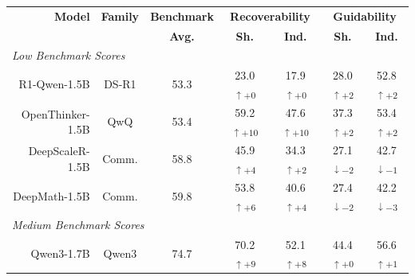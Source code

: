 \documentclass{article} %
\begin{document}
\begin{table}[t]
  \centering
  \small
  \begin{tabular}{r|c|c|cc|cc}
    \toprule
    \textbf{Model} &
    \textbf{Family} &
    \multicolumn{1}{c|}{\textbf{Benchmark}} & 
    \multicolumn{2}{c|}{\textbf{Recoverability}} &
    \multicolumn{2}{c}{\textbf{Guidability}} \\
    &  & \multicolumn{1}{c|}{\textbf{Avg.}} &
    \textbf{Sh.} & \textbf{Ind.} & \textbf{Sh.} & \textbf{Ind.} \\
    \midrule
    \multicolumn{7}{l}{\textit{Low Benchmark Scores}} \\
    \midrule
    
    R1-Qwen-1.5B      & DS-R1 & 53.3 &
    \cellcolor{green!0}23.0\textsubscript{$\uparrow+0$} &
    \cellcolor{green!0}17.9\textsubscript{$\uparrow+0$} &
    \cellcolor{green!12}28.0\textsubscript{$\uparrow+2$} &
    \cellcolor{green!12}52.8\textsubscript{$\uparrow+2$} \\
    
    OpenThinker-1.5B  & QwQ   & 53.4 &
    \cellcolor{green!33}59.2\textsubscript{$\uparrow+10$} &
    \cellcolor{green!33}47.6\textsubscript{$\uparrow+10$} &
    \cellcolor{green!12}37.3\textsubscript{$\uparrow+2$} &
    \cellcolor{green!12}53.4\textsubscript{$\uparrow+2$} \\
    
    DeepScaleR-1.5B   & Comm. & 58.8 &
    \cellcolor{green!15}45.9\textsubscript{$\uparrow+4$} &
    \cellcolor{green!12}34.3\textsubscript{$\uparrow+2$} &
    \cellcolor{red!12}27.1\textsubscript{$\downarrow-2$} &
    \cellcolor{red!11}42.7\textsubscript{$\downarrow-1$} \\
    
    DeepMath-1.5B     & Comm. & 59.8 &
    \cellcolor{green!16}53.8\textsubscript{$\uparrow+6$} &
    \cellcolor{green!15}40.6\textsubscript{$\uparrow+4$} &
    \cellcolor{red!12}27.4\textsubscript{$\downarrow-2$} &
    \cellcolor{red!13}42.2\textsubscript{$\downarrow-3$} \\
    
    \midrule
    \multicolumn{7}{l}{\textit{Medium Benchmark Scores}} \\
    \midrule
    
    Qwen3-1.7B        & Qwen3 & 74.7 &
    \cellcolor{green!29}70.2\textsubscript{$\uparrow+9$} &
    \cellcolor{green!28}52.1\textsubscript{$\uparrow+8$} &
    \cellcolor{green!0}44.4\textsubscript{$\uparrow+0$} &
    \cellcolor{green!11}56.6\textsubscript{$\uparrow+1$} \\
    

\end{tabular}
\end{table}
\end{document}
